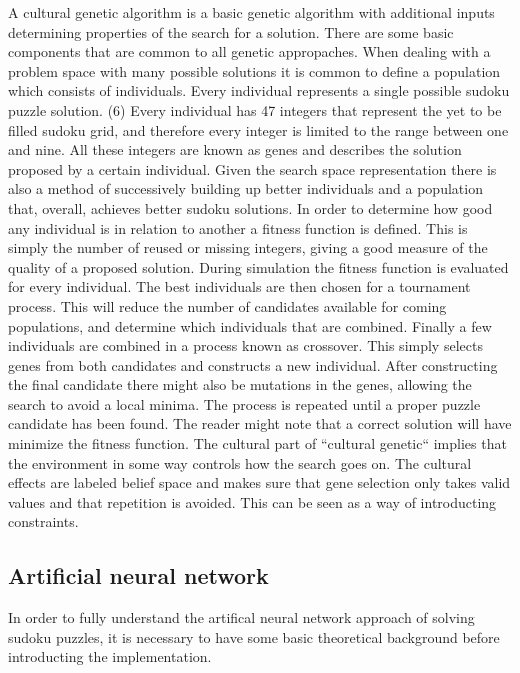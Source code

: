 \documentclass[a4paper,11pt]{kth-mag}
\begin{document}
A cultural genetic algorithm is a basic genetic algorithm with additional inputs determining properties of the search for a solution. There are some basic components that are common to all genetic appropaches.
\newline
When dealing with a problem space with many possible solutions it is common to define a population which consists of individuals. Every individual represents a single possible sudoku puzzle solution. (6) Every individual has 47 integers that represent the yet to be filled sudoku grid, and therefore every integer is limited to the range between one and nine. All these integers are known as genes and describes the solution proposed by a certain individual.
\newline
Given the search space representation there is also a method of successively building up better individuals and a population that, overall, achieves better sudoku solutions. In order to determine how good any individual is in relation to another a fitness function is defined. This is simply the number of reused or missing integers, giving a good measure of the quality of a proposed solution. During simulation the fitness function is evaluated for every individual. The best individuals are then chosen for a tournament process. This will reduce the number of candidates available for coming populations, and determine which individuals that are combined. Finally a few individuals are combined in a process known as crossover. This simply selects genes from both candidates and constructs a new individual. After constructing the final candidate there might also be mutations in the genes, allowing the search to avoid a local minima. The process is repeated until a proper puzzle candidate has been found. The reader might note that a correct solution will have minimize the fitness function.
\newline
The cultural part of ``cultural genetic`` implies that the environment in some way controls how the search goes on. The cultural effects are labeled belief space and makes sure that gene selection only takes valid values and that repetition is avoided. This can be seen as a way of introducting constraints.

\subsection{Artificial neural network}
In order to fully understand the artifical neural network approach of solving sudoku puzzles, it is necessary to have some basic theoretical background before introducting the implementation.
\end{document}
